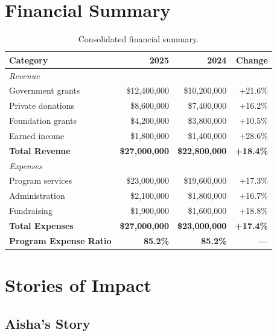 \documentclass[
    language=english,
    doctype=impact-report,
    institution=none,
]{../../omnilatex}
\begin{document}
\section{Financial Summary}

\begin{table}[h]
    \centering
    \begin{tabular}{lrrr}
        \toprule
        \textbf{Category} & \textbf{2025} & \textbf{2024} & \textbf{Change} \\
        \midrule
        \multicolumn{4}{l}{\textit{Revenue}} \\
        \quad Government grants & \$12,400,000 & \$10,200,000 & +21.6\% \\
        \quad Private donations & \$8,600,000 & \$7,400,000 & +16.2\% \\
        \quad Foundation grants & \$4,200,000 & \$3,800,000 & +10.5\% \\
        \quad Earned income & \$1,800,000 & \$1,400,000 & +28.6\% \\
        \midrule
        \textbf{Total Revenue} & \textbf{\$27,000,000} & \textbf{\$22,800,000} & \textbf{+18.4\%} \\
        \midrule
        \multicolumn{4}{l}{\textit{Expenses}} \\
        \quad Program services & \$23,000,000 & \$19,600,000 & +17.3\% \\
        \quad Administration & \$2,100,000 & \$1,800,000 & +16.7\% \\
        \quad Fundraising & \$1,900,000 & \$1,600,000 & +18.8\% \\
        \midrule
        \textbf{Total Expenses} & \textbf{\$27,000,000} & \textbf{\$23,000,000} & \textbf{+17.4\%} \\
        \midrule
        \textbf{Program Expense Ratio} & \textbf{85.2\%} & \textbf{85.2\%} & \textbf{---} \\
        \bottomrule
    \end{tabular}
    \caption{Consolidated financial summary.}
\end{table}

\section{Stories of Impact}

\subsection{Aisha's Story}
\end{document}
